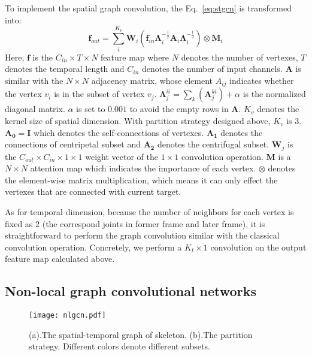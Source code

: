 \documentclass[10pt,twocolumn,letterpaper]{article}
\begin{document}
    To implement the spatial graph convolution, the Eq.~\ref{eq:stgcn} is transformed into:
    \begin{equation}
    \label{eq:stgcni}
    \mathbf{f}_{out} = \sum_i^{K_v} \mathbf{W}_i (\mathbf{f}_{in}{\mathbf{\Lambda}}_i^{-\frac{1}{2}} {\mathbf{A}}_i {\mathbf{\Lambda}}_i^{-\frac{1}{2}}) \otimes\mathbf{M}_i
    \end{equation}
    Here, $\mathbf{f}$ is the $C_{in}\times T\times N$ feature map where $N$ denotes the number of vertexes, $T$ denotes the temporal length and $C_{in}$ denotes the number of input channels. $\mathbf{A}$ is similar with the $N\times N$ adjacency matrix, whose element $A_{ij}$ indicates whether the vertex $v_i$ is in the subset of vertex $v_j$. $\mathbf{\Lambda}_j^{ii}=\sum_k (\mathbf{A}_j^{ki})+\alpha$ is the normalized diagonal matrix. $\alpha$ is set to $0.001$ to avoid the empty rows in $\mathbf{A}$. $K_v$ denotes the kernel size of spatial dimension. With partition strategy designed above, $K_v$ is $3$. $\mathbf{A_0}=\mathbf{I}$ which denotes the self-connections of vertexes. $\mathbf{A_1}$ denotes the connections of centripetal subset and $\mathbf{A_2}$ denotes the centrifugal subset. $\mathbf{W}_j$ is the $C_{out}\times C_{in}\times 1 \times 1$ weight vector of the $1\times 1$ convolution operation. $\mathbf{M}$ is a $N\times N$ attention map which indicates the importance of each vertex. $\otimes$ denotes the element-wise matrix multiplication, which means it can only effect the vertexes that are connected with current target.
    
    As for temporal dimension, because the number of neighbors for each vertex is fixed as $2$ (the correspond joints in former frame and later frame), it is straightforward to perform the graph convolution similar with the classical convolution operation. Concretely, we perform a $K_t\times 1$ convolution on the output feature map calculated above.
    
	\subsection{Non-local graph convolutional networks}
    \label{nlgcn}
    
    \begin{figure}[tb]
	\begin{center}
	\texttt{[image: nlgcn.pdf]}
	\caption{(a).The spatial-temporal graph of skeleton. (b).The partition strategy. Different colors denote different subsets.}
	\label{fig:nlgcn}	
	\end{center}
	\end{figure}
\end{document}
